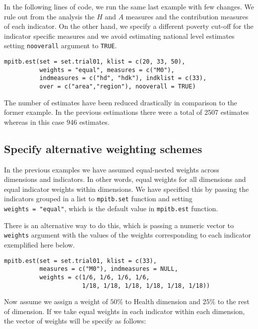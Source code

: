 In the following lines of code, we run the same last example with
few changes. We rule out from the analysis the \(H\) and \(A\)
measures and the contribution measures of each indicator. On the other
hand, we specify a different poverty cut-off for the indicator specific
measures and we avoid estimating national level estimates
setting \texttt{nooverall} argument to \texttt{TRUE}.

\begin{verbatim}
mpitb.est(set = set.trial01, klist = c(20, 33, 50),
          weights = "equal", measures = c("M0"), 
          indmeasures = c("hd", "hdk"), indklist = c(33), 
          over = c("area","region"), nooverall = TRUE)
\end{verbatim}

The number of estimates have been reduced drastically in
comparison to the former example. In the previous estimations there were a total of 2507 estimates whereas in this case 946 estimates.

\hypertarget{specify-alternative-weighting-schemes}{%
\subsection{Specify alternative weighting schemes}\label{specify-alternative-weighting-schemes}}

In the previous examples we have assumed equal-nested weights across
dimensions and indicators. In other words, equal weights for all
dimensions and equal indicator weights within dimensions. We have
specified this by passing the indicators grouped in a list to \texttt{mpitb.set} function and setting \texttt{weights\ =\ "equal"}, which
is the default value in \texttt{mpitb.est} function.

There is an alternative way to do this, which is passing a numeric vector to
\texttt{weights} argument with the values of the weights corresponding to each
indicator exemplified here below.

\begin{verbatim}
mpitb.est(set = set.trial01, klist = c(33), 
          measures = c("M0"), indmeasures = NULL,
          weights = c(1/6, 1/6, 1/6, 1/6, 
                      1/18, 1/18, 1/18, 1/18, 1/18, 1/18))
\end{verbatim}

Now assume we assign a weight of \(50\%\) to Health dimension and \(25\%\)
to the rest of dimension. If we take equal weights in each indicator
within each dimension, the vector of weights will be specify as follows:

